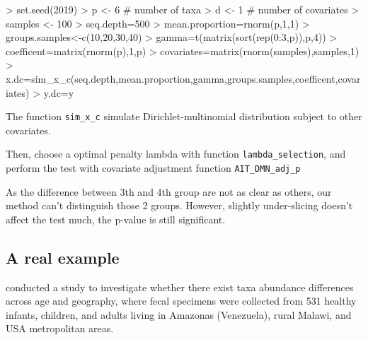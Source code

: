 \documentclass[a4paper,11pt]{article}
\newcommand{\Rcode}[1]{{\texttt{#1}}}
\begin{document}
\begin{Schunk}
\begin{Sinput}
> set.seed(2019)
> p <- 6  # number of taxa
> d <- 1  # number of covariates
> samples <- 100
> seq.depth=500
> mean.proportion=rnorm(p,1,1)
> groups.samples<-c(10,20,30,40)
> gamma=t(matrix(sort(rep(0:3,p)),p,4))
> coefficent=matrix(rnorm(p),1,p)
> covariates=matrix(rnorm(samples),samples,1)
> x.dc=sim_x_c(seq.depth,mean.proportion,gamma,groups.samples,coefficent,covariates)
> y.dc=y
\end{Sinput}
\end{Schunk}

The function \Rcode{sim\_x\_c} simulate Dirichlet-multinomial distribution subject to other covariates.

Then, choose a optimal penalty lambda with function \Rcode{lambda\_selection}, and perform the test with covariate adjustment function \Rcode{AIT\_DMN\_adj\_p}

\begin{Schunk}
\end{Schunk}

As the difference between 3th and 4th group are not as clear as others, our method can't distinguish those 2 groups. However, slightly under-slicing doesn't  affect the test much, the p-value is still significant.

\subsection{A real example}

\cite{yatsunenko2012human} conducted a study to investigate whether there exist taxa
abundance differences across age and geography, where fecal specimens were collected from 531 healthy infants, children, and adults living in Amazonas (Venezuela), rural Malawi, and USA metropolitan areas.
\end{document}
